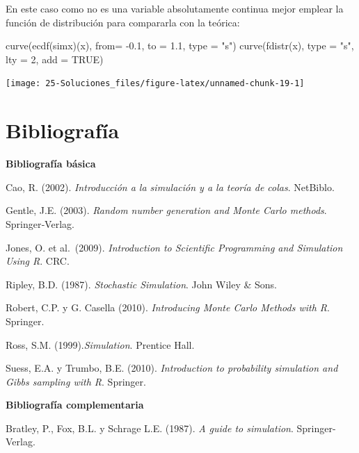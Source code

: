 \documentclass[
]{book}
\newenvironment{Shaded}{\begin{snugshade}}{\end{snugshade}}
\newcommand{\AttributeTok}[1]{\textcolor[rgb]{0.77,0.63,0.00}{#1}}
\newcommand{\ConstantTok}[1]{\textcolor[rgb]{0.00,0.00,0.00}{#1}}
\newcommand{\DecValTok}[1]{\textcolor[rgb]{0.00,0.00,0.81}{#1}}
\newcommand{\FloatTok}[1]{\textcolor[rgb]{0.00,0.00,0.81}{#1}}
\newcommand{\FunctionTok}[1]{\textcolor[rgb]{0.00,0.00,0.00}{#1}}
\newcommand{\NormalTok}[1]{#1}
\newcommand{\SpecialCharTok}[1]{\textcolor[rgb]{0.00,0.00,0.00}{#1}}
\newcommand{\StringTok}[1]{\textcolor[rgb]{0.31,0.60,0.02}{#1}}
\theoremstyle{break}
\theoremstyle{nonumberplain}
\begin{document}
\begin{enumerate}
  En este caso como no es una variable absolutamente continua mejor emplear
  la función de distribución para compararla con la teórica:

\begin{Shaded}
\begin{Highlighting}[]
\FunctionTok{curve}\NormalTok{(}\FunctionTok{ecdf}\NormalTok{(simx)(x), }\AttributeTok{from=} \SpecialCharTok{{-}}\FloatTok{0.1}\NormalTok{, }\AttributeTok{to =} \FloatTok{1.1}\NormalTok{, }\AttributeTok{type =} \StringTok{"s"}\NormalTok{)}
\FunctionTok{curve}\NormalTok{(}\FunctionTok{fdistr}\NormalTok{(x), }\AttributeTok{type =} \StringTok{"s"}\NormalTok{, }\AttributeTok{lty =} \DecValTok{2}\NormalTok{, }\AttributeTok{add =} \ConstantTok{TRUE}\NormalTok{)}
\end{Highlighting}
\end{Shaded}

  \begin{center}\texttt{[image: 25-Soluciones\_files/figure-latex/unnamed-chunk-19-1]} \end{center}
\end{enumerate}

\hypertarget{bibliografuxeda}{%
\chapter*{Bibliografía}\label{bibliografuxeda}}

\textbf{Bibliografía básica}

Cao, R. (2002). \emph{Introducción a la simulación y a la teoría de colas}. NetBiblo.

Gentle, J.E. (2003). \emph{Random number generation and Monte Carlo methods}. Springer‐Verlag.

Jones, O. et al.~(2009). \emph{Introduction to Scientific Programming and Simulation Using R}. CRC.

Ripley, B.D. (1987). \emph{Stochastic Simulation}. John Wiley \& Sons.

Robert, C.P. y G. Casella (2010). \emph{Introducing Monte Carlo Methods with R}. Springer.

Ross, S.M. (1999).\emph{Simulation}. Prentice Hall.

Suess, E.A. y Trumbo, B.E. (2010). \emph{Introduction to probability simulation and Gibbs sampling with R}. Springer.

\textbf{Bibliografía complementaria}

Bratley, P., Fox, B.L. y Schrage L.E. (1987). \emph{A guide to simulation}. Springer-Verlag.
\end{document}
